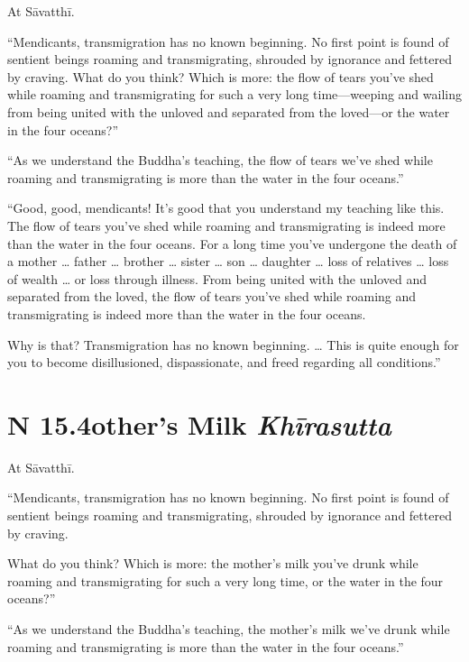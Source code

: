 \documentclass[12pt,openany]{book}%
\newcommand*{\suttatitleacronym}[1]{\smaller[2]{#1}\vspace*{.3em}}
\newcommand*{\suttatitletranslation}[1]{\linebreak{#1}}
\newcommand*{\suttatitleroot}[1]{\linebreak\smaller[2]\itshape{#1}}
\newcommand*{\tocacronym}[1]{\hspace*{-3.3em}{#1}\quad}
\newcommand*{\toctranslation}[1]{#1}
\newcommand*{\tocroot}[1]{(\textit{#1})}
\begin{document}
At \textsanskrit{Sāvatthī}. 

“Mendicants, transmigration has no known beginning. No first point is found of sentient beings roaming and transmigrating, shrouded by ignorance and fettered by craving. What do you think? Which is more: the flow of tears you’ve shed while roaming and transmigrating for such a very long time—weeping and wailing from being united with the unloved and separated from the loved—or the water in the four oceans?” 

“As we understand the Buddha’s teaching, the flow of tears we’ve shed while roaming and transmigrating is more than the water in the four oceans.” 

“Good, good, mendicants! It’s good that you understand my teaching like this. The flow of tears you’ve shed while roaming and transmigrating is indeed more than the water in the four oceans. For a long time you’ve undergone the death of a mother … father … brother … sister … son … daughter … loss of relatives … loss of wealth … or loss through illness. From being united with the unloved and separated from the loved, the flow of tears you’ve shed while roaming and transmigrating is indeed more than the water in the four oceans. 

Why is that? Transmigration has no known beginning. … This is quite enough for you to become disillusioned, dispassionate, and freed regarding all conditions.” 

%
\section*{{\suttatitleacronym SN 15.4}{\suttatitletranslation Mother’s Milk }{\suttatitleroot Khīrasutta}}
\addcontentsline{toc}{section}{\tocacronym{SN 15.4} \toctranslation{Mother’s Milk } \tocroot{Khīrasutta}}

At \textsanskrit{Sāvatthī}. 

“Mendicants, transmigration has no known beginning. No first point is found of sentient beings roaming and transmigrating, shrouded by ignorance and fettered by craving. 

What do you think? Which is more: the mother’s milk you’ve drunk while roaming and transmigrating for such a very long time, or the water in the four oceans?” 

“As we understand the Buddha’s teaching, the mother’s milk we’ve drunk while roaming and transmigrating is more than the water in the four oceans.” 
\end{document}
